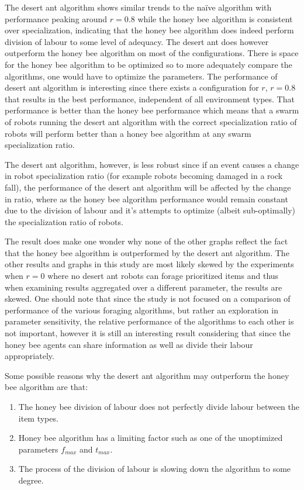 The desert ant algorithm shows similar trends to the na\"ive algorithm with performance peaking around $r=0.8$ while the honey bee algorithm is consistent over specialization, indicating that the honey bee algorithm does indeed perform division of labour to some level of adequacy. The desert ant does however outperform the honey bee algorithm on most of the configurations. There is space for the honey bee algorithm to be optimized so to more adequately compare the algorithms, one would have to optimize the parameters. 
The performance of desert ant algorithm is interesting since there exists a configuration for $r$, $r=0.8$ that results in the best performance, independent of all environment types. That performance is better than the honey bee performance which means that a swarm of robots running the desert ant algorithm with the correct specialization ratio of robots will perform better than a honey bee algorithm at any swarm specialization ratio. 

The desert ant algorithm, however, is less robust since if an event causes a change in robot specialization ratio (for example robots becoming damaged in a rock fall), the performance of the desert ant algorithm will be affected by the change in ratio, where as the honey bee algorithm performance would remain constant due to the division of labour and it's attempts to optimize (albeit sub-optimally) the specialization ratio of robots. 

The result does make one wonder why none of the other graphs reflect the fact that the honey bee algorithm is outperformed by the desert ant algorithm. The other results and graphs in this study are most likely skewed by the experiments when $r=0$ where no desert ant robots can forage prioritized items and thus when examining results aggregated over a different parameter, the results are skewed. One should note that since the study is not focused on a comparison of performance of the various foraging algorithms, but rather an exploration in parameter sensitivity, the relative performance of the algorithms to each other is not important, however it is still an interesting result considering that since the honey bee agents can share information as well as divide their labour appropriately. 
 
Some possible reasons why the desert ant algorithm may outperform the honey bee algorithm are that:
\begin{enumerate}
	\item The honey bee division of labour does not perfectly divide labour between the item types.
	\item Honey bee algorithm has a limiting factor such as one of the unoptimized parameters $f_{max}$ and $t_{max}$. 
	\item The process of the division of labour is slowing down the algorithm to some degree.
\end{enumerate}

